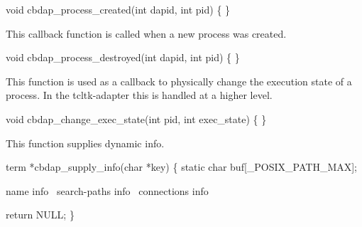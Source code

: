 \nwenddocs{}\endmoddef\let\nwnotused=\nwoutput{}
void cbdap_process_created(int dapid, int pid)
\{
\}
\nwendcode{}\nwdocspar


This callback function is called when a new process was created.

\nwenddocs{}\endmoddef\let\nwnotused=\nwoutput{}
void cbdap_process_destroyed(int dapid, int pid)
\{
\}
\nwendcode{}\nwdocspar


This function is used as a callback to physically change
the execution state of a process.
In the tcltk-adapter this is handled at a higher level.

\nwenddocs{}\endmoddef\let\nwnotused=\nwoutput{}
void cbdap_change_exec_state(int pid, int exec_state)
\{
\}
\nwendcode{}\nwdocspar


This function supplies dynamic info.

\nwenddocs{}\endmoddef\let\nwnotused=\nwoutput{}
term *cbdap_supply_info(char *key)
\{
  static char buf[_POSIX_PATH_MAX];

  \LA{}name info~{\nwtagstyle{}}\RA{}
  \LA{}search-paths info~{\nwtagstyle{}}\RA{}
  \LA{}connections info~{\nwtagstyle{}}\RA{}

  return NULL;
\}
\nwendcode{}\nwdocspar

